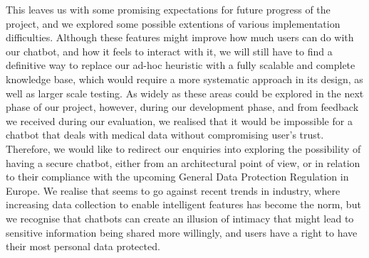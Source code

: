 This leaves us with some promising expectations for future progress of the project, and we explored some possible extentions of various implementation difficulties. Although these features might improve how much users can do with our chatbot, and how it feels to interact with it, we will still have to find a definitive way to replace our ad-hoc heuristic with a fully scalable and complete knowledge base, which would require a more systematic approach in its design, as well as larger scale testing. As widely as these areas could be explored in the next phase of our project, however, during our development phase, and from feedback we received during our evaluation, we realised that it would be impossible for a chatbot that deals with medical data without compromising user's trust. Therefore, we would like to redirect our enquiries into exploring the possibility of having a secure chatbot, either from an architectural point of view, or in relation to their compliance with the upcoming General Data Protection Regulation in Europe. We realise that seems to go against recent trends in industry, where increasing data collection to enable intelligent features has become the norm, but we recognise that chatbots can create an illusion of intimacy that might lead to sensitive information being shared more willingly, and users have a right to have their most personal data protected.
